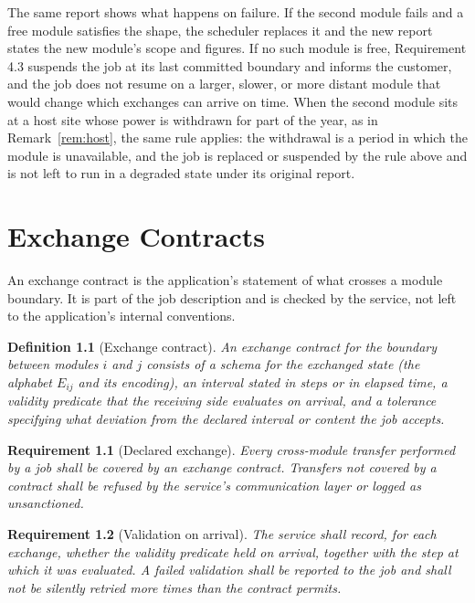 \documentclass[11pt,openany]{book}
\newtheorem{definition}{Definition}[chapter]
\newtheorem{requirement}{Requirement}[chapter]
\theoremstyle{remark}
\begin{document}
The same report shows what happens on failure. If the second module fails and a free module satisfies the shape, the scheduler replaces it and the new report states the new module's scope and figures. If no such module is free, Requirement 4.3 suspends the job at its last committed boundary and informs the customer, and the job does not resume on a larger, slower, or more distant module that would change which exchanges can arrive on time. When the second module sits at a host site whose power is withdrawn for part of the year, as in Remark~\ref{rem:host}, the same rule applies: the withdrawal is a period in which the module is unavailable, and the job is replaced or suspended by the rule above and is not left to run in a degraded state under its original report.

\chapter{Exchange Contracts}

An exchange contract is the application's statement of what crosses a module boundary. It is part of the job description and is checked by the service, not left to the application's internal conventions.

\begin{definition}[Exchange contract]
An exchange contract for the boundary between modules $i$ and $j$ consists of a schema for the exchanged state (the alphabet $E_{ij}$ and its encoding), an interval stated in steps or in elapsed time, a validity predicate that the receiving side evaluates on arrival, and a tolerance specifying what deviation from the declared interval or content the job accepts.
\end{definition}

\begin{requirement}[Declared exchange]
Every cross-module transfer performed by a job shall be covered by an exchange contract. Transfers not covered by a contract shall be refused by the service's communication layer or logged as unsanctioned.
\end{requirement}

\begin{requirement}[Validation on arrival]
The service shall record, for each exchange, whether the validity predicate held on arrival, together with the step at which it was evaluated. A failed validation shall be reported to the job and shall not be silently retried more times than the contract permits.
\end{requirement}
\end{document}
